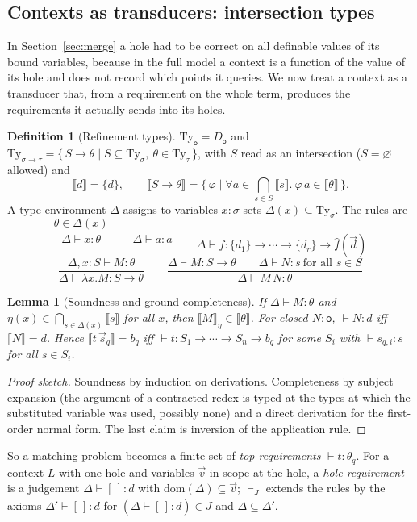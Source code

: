\documentclass[11pt]{article}
\newcommand{\Ground}{\mathsf{o}\xspace}
\newcommand{\hole}[1]{[\,]_{#1}}
\newcommand{\sem}[1]{\llbracket #1\rrbracket}
\newcommand{\Ty}{\mathrm{Ty}}
\newtheorem{lemma}[theorem]{Lemma}
\theoremstyle{definition}
\newtheorem{definition}[theorem]{Definition}
\begin{document}
\subsection{Contexts as transducers: intersection types}\label{sec:itypes}

In Section~\ref{sec:merge} a hole had to be correct on all definable
values of its bound variables, because in the full model a context is a
function of the value of its hole and does not record which points it
queries.  We now treat a context as a transducer that, from a requirement
on the whole term, produces the requirements it actually sends into its
holes.

\begin{definition}[Refinement types]
$\Ty_\Ground=D_\Ground$ and
$\Ty_{\sigma\to\tau}=\{\,S\to\theta\mid S\subseteq\Ty_\sigma,\ \theta\in\Ty_\tau\,\}$,
with $S$ read as an intersection ($S=\varnothing$ allowed) and
\[
  \sem d=\{d\},\qquad
  \sem{S\to\theta}=\{\,\varphi\mid
     \forall a\in\textstyle\bigcap_{s\in S}\sem s.\ \varphi\,a\in\sem\theta\,\}.
\]
A type environment $\Delta$ assigns to variables $x:\sigma$ sets
$\Delta(x)\subseteq\Ty_\sigma$.  The rules are
\[
\frac{\theta\in\Delta(x)}{\Delta\vdash x:\theta}
\qquad
\frac{}{\Delta\vdash a:a}
\qquad
\frac{}{\Delta\vdash f:\{d_1\}\to\cdots\to\{d_r\}\to\hat f(\vec d)}
\]
\[
\frac{\Delta,x:S\vdash M:\theta}{\Delta\vdash\lambda x.M:S\to\theta}
\qquad
\frac{\Delta\vdash M:S\to\theta\qquad\Delta\vdash N:s\ \text{for all } s\in S}
     {\Delta\vdash M\,N:\theta}
\]
\end{definition}

\begin{lemma}[Soundness and ground completeness]\label{lem:it}
If $\Delta\vdash M:\theta$ and $\eta(x)\in\bigcap_{s\in\Delta(x)}\sem s$
for all $x$, then $\sem M_\eta\in\sem\theta$.  For closed $N:\Ground$,
$\vdash N:d$ iff $\sem N=d$.  Hence $\sem{t\,\vec s_q}=b_q$ iff
$\vdash t:S_1\to\cdots\to S_n\to b_q$ for some $S_i$ with
$\vdash s_{q,i}:s$ for all $s\in S_i$.
\end{lemma}
\begin{proof}[Proof sketch]
Soundness by induction on derivations.  Completeness by subject expansion
(the argument of a contracted redex is typed at the types at which the
substituted variable was used, possibly none) and a direct derivation for
the first-order normal form.  The last claim is inversion of the
application rule.
\end{proof}

So a matching problem becomes a finite set of \emph{top requirements}
$\vdash t:\theta_q$.  For a context $L$ with one hole and variables
$\vec v$ in scope at the hole, a \emph{hole requirement} is a judgement
$\Delta\vdash\hole{}:d$ with $\mathrm{dom}(\Delta)\subseteq\vec v$;
$\vdash_J$ extends the rules by the axioms
$\Delta'\vdash\hole{}:d$ for $(\Delta\vdash\hole{}:d)\in J$ and
$\Delta\subseteq\Delta'$.
\end{document}
